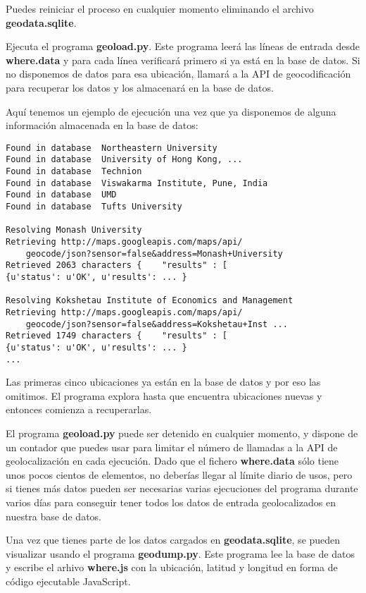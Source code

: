 Puedes reiniciar el proceso en cualquier momento eliminando el archivo
{\bf geodata.sqlite}.

Ejecuta el programa {\bf geoload.py}. Este programa leerá las líneas
de entrada desde {\bf where.data} y para cada línea verificará primero si ya
está en la base de datos. Si no disponemos de datos para esa ubicación,
llamará a la API de geocodificación para recuperar los datos y los almacenará
en la base de datos.

Aquí tenemos un ejemplo de ejecución una vez que ya disponemos de alguna información almacenada en la
base de datos:

\beforeverb
\begin{verbatim}
Found in database  Northeastern University
Found in database  University of Hong Kong, ...
Found in database  Technion
Found in database  Viswakarma Institute, Pune, India
Found in database  UMD
Found in database  Tufts University

Resolving Monash University
Retrieving http://maps.googleapis.com/maps/api/
    geocode/json?sensor=false&address=Monash+University
Retrieved 2063 characters {    "results" : [  
{u'status': u'OK', u'results': ... }

Resolving Kokshetau Institute of Economics and Management
Retrieving http://maps.googleapis.com/maps/api/
    geocode/json?sensor=false&address=Kokshetau+Inst ...
Retrieved 1749 characters {    "results" : [  
{u'status': u'OK', u'results': ... }
...
\end{verbatim}
\afterverb
%
Las primeras cinco ubicaciones ya están en la base de datos y por eso
las omitimos. El programa explora hasta que encuentra ubicaciones
nuevas y entonces comienza a recuperarlas.

El programa {\bf geoload.py} puede ser detenido en cualquier momento, y dispone de un
contador que puedes usar para limitar el número de llamadas a la API de geolocalización
en cada ejecución. Dado que el fichero {\bf where.data} sólo tiene unos pocos cientos
de elementos, no deberías llegar al límite diario de usos, pero si
tienes más datos pueden ser necesarias varias ejecuciones del programa durante varios días
para conseguir tener todos los datos de entrada geolocalizados en nuestra base de datos.

Una vez que tienes parte de los datos cargados en {\bf geodata.sqlite}, se pueden
visualizar usando el programa {\bf geodump.py}. Este
programa lee la base de datos y escribe el arhivo {\bf where.js}
con la ubicación, latitud y longitud en forma de
código ejecutable JavaScript.

